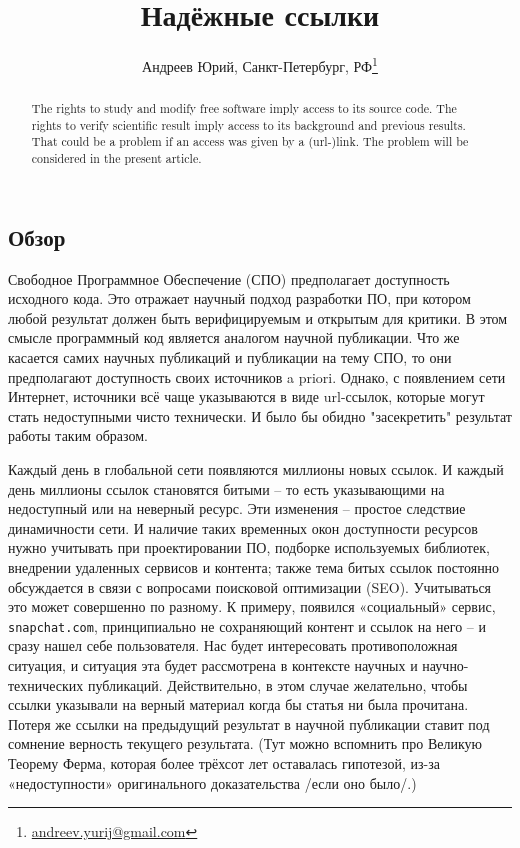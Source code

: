 \documentclass[10pt, a5paper]{article}
\begin{document}
\title{Надёжные ссылки}
\author{Андреев Юрий, Санкт-Петербург, РФ\footnote{\url{andreev.yurij@gmail.com}}}
\maketitle
\begin{abstract}
The rights to study and modify free software imply access to its source code.
The rights to verify scientific result imply access to its background and
previous results. That could be a problem if an access was given by a (url-)link.
The problem will be considered in the present article.
\end{abstract}

\subsection*{Обзор}
 
Свободное Программное Обеспечение (СПО) предполагает доступность исходного 
кода. Это отражает научный подход разработки ПО, при 
котором любой результат должен быть верифицируемым и открытым для 
критики. В этом смысле программный код является аналогом
научной публикации. Что же касается самих 
научных публикаций и публикации на тему СПО, то они предполагают 
доступность своих источников a priori.   
Однако, с появлением сети Интернет, источники всё чаще указываются
в виде url-ссылок, которые могут стать недоступными чисто технически.
И было бы обидно "засекретить" результат работы таким образом. 

Каждый день в глобальной сети появляются миллионы новых  ссылок.
И  каждый  день  миллионы  ссылок  становятся  битыми  –   то   есть
указывающими на недоступный или на неверный ресурс. Эти изменения  –
простое следствие динамичности  сети.  И  наличие  таких   временных
окон доступности ресурсов нужно  учитывать  при  проектировании  ПО,
подборке используемых  библиотек,  внедрении  удаленных  сервисов  и
контента; также тема битых ссылок постоянно обсуждается  в  связи  с
вопросами  поисковой  оптимизации  (SEO).   Учитываться  это   может
совершенно по разному.  К  примеру,  появился  «социальный»  сервис,
\texttt{snapchat.com}, принципиально  не  сохраняющий  контент  и  
ссылок  на него  – и  сразу  нашел  себе  пользователя.  
Нас  будет  интересовать
противоположная  ситуация,  и  ситуация  эта  будет  рассмотрена   в
контексте научных и научно-технических публикаций. Действительно,  в
этом случае желательно, чтобы ссылки указывали  на  верный  материал
когда бы статья ни была прочитана. Потеря же  ссылки  на  предыдущий
результат  в  научной  публикации  ставит  под   сомнение   верность
текущего  результата.  (Тут  можно  вспомнить  про  Великую  Теорему
Ферма,  которая  более  трёхсот  лет  оставалась  гипотезой,   из-за
«недоступности» оригинального доказательства /если оно было/.)
\end{document}
